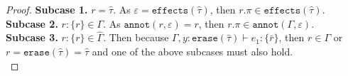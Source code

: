 \documentclass{llncs}
\newcommand{\keywadj}[1]{\mathtt{#1}}
\newcommand{\kwa}[1]{\keywadj{ #1 }}
\begin{document}
\begin{proof}
\noindent
\textbf{Subcase 1.} $r = \hat \tau$. As $\varepsilon = \kwa{effects}(\hat \tau)$, then $r.\pi \in \kwa{effects}(\hat \tau)$. \\

\noindent
\textbf{Subcase 2.} $r: \{ r \} \in \Gamma$. As $\kwa{annot}(r, \varepsilon) = r$, then $r.\pi \in \kwa{annot}(\Gamma, \varepsilon)$. \\

\noindent
\textbf{Subcase 3.} $r: \{ r \} \in \hat \Gamma$. Then because $\Gamma, y: \kwa{erase}(\hat \tau) \vdash e_1: \{ \bar r \}$, then $r \in \Gamma$ or $r = \kwa{erase}(\hat \tau) = \hat \tau$ and one of the above subcases must also hold. \\


\end{proof}
\end{document}
